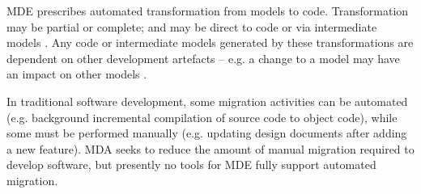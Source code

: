 MDE prescribes automated transformation from models to code. Transformation may be partial or complete; and may be direct to code or via intermediate models \cite{kleppe03mda}. Any code or intermediate models generated by these transformations are dependent on other development artefacts -- e.g. a change to a model may have an impact on other models \cite{deursen07mdse}.

In traditional software development, some migration activities can be automated (e.g. background incremental compilation of source code to object code), while some must be performed manually (e.g. updating design documents after adding a new feature). MDA seeks to reduce the amount of manual migration required to develop software, but presently no tools for MDE fully support automated migration.